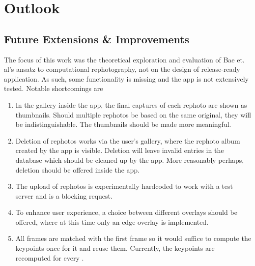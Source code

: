 \chapter{Outlook}\label{ch:outlook}
\section{Future Extensions \& Improvements}

The focus of this work was the theoretical exploration and evaluation of Bae et.
al's ansatz to computational rephotography, not on the design of release-ready
application. As such, some functionality is missing and the app is not
extensively tested. Notable shortcomings are
\begin{enumerate}
   \item In the gallery inside the app, the final captures of each rephoto are
      shown as thumbnails. Should multiple rephotos be based on the same
      original, they will be indistinguishable. The thumbnails should be made
      more meaningful.

   \item Deletion of rephotos works via the user's gallery, where the rephoto
      album created by the app is visible. Deletion will leave invalid entries
      in the database which should be cleaned up by the app. More reasonably
      perhaps, deletion should be offered inside the app.


   \item The upload of rephotos is experimentally hardcoded to work with a test
      server and is a blocking request.

   \item To enhance user experience, a choice between different overlays should
      be offered, where at this time only an edge overlay is implemented.

   \item All frames are matched with the first frame so it would suffice to
      compute the keypoints once for it and reuse them. Currently, the keypoints
      are recomputed for every .


\end{enumerate}
